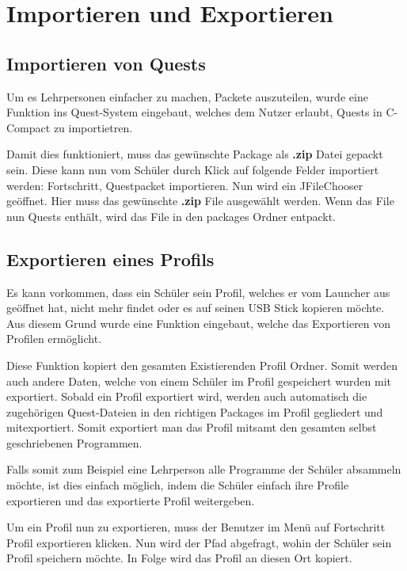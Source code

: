 \section{Importieren und Exportieren}
\subsection{Importieren von Quests}
\label{sec:quest-import}
Um es Lehrpersonen einfacher zu machen, Packete auszuteilen, wurde eine Funktion ins Quest-System eingebaut, welches dem Nutzer erlaubt, Quests in C-Compact zu importietren.

Damit dies funktioniert, muss das gewünschte Package als \textbf{.zip} Datei gepackt sein. Diese kann nun vom Schüler durch Klick auf folgende Felder importiert werden: Fortschritt, Questpacket importieren. Nun wird ein JFileChooser geöffnet. Hier muss das gewünschte \textbf{.zip} File ausgewählt werden. Wenn das File nun Quests enthält, wird das File in den packages Ordner entpackt.

\subsection{Exportieren eines Profils}
\label{sec:quest-export}
Es kann vorkommen, dass ein Schüler sein Profil, welches er vom Launcher aus geöffnet hat, nicht mehr findet oder es auf seinen USB Stick kopieren möchte. Aus diesem Grund wurde eine Funktion eingebaut, welche das Exportieren von Profilen ermöglicht.

Diese Funktion kopiert den gesamten Existierenden Profil Ordner. Somit werden auch andere Daten, welche von einem Schüler im Profil gespeichert wurden mit exportiert. Sobald ein Profil exportiert wird, werden auch automatisch die zugehörigen Quest-Dateien in den richtigen Packages im Profil gegliedert und mitexportiert. Somit exportiert man das Profil mitsamt den gesamten selbst geschriebenen Programmen.

Falls somit zum Beispiel eine Lehrperson alle Programme der Schüler absammeln möchte, ist dies einfach möglich, indem die Schüler einfach ihre Profile exportieren und das exportierte Profil weitergeben.

Um ein Profil nun zu exportieren, muss der Benutzer im Menü auf Fortschritt Profil exportieren klicken. Nun wird der Pfad abgefragt, wohin der Schüler sein Profil speichern möchte. In Folge wird das Profil an diesen Ort kopiert.